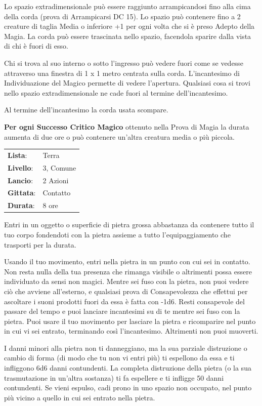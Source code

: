 \begin{multicols}{2}
Lo spazio extradimensionale può essere raggiunto arrampicandosi fino alla cima della corda (prova di Arrampicarsi DC 15). Lo spazio può contenere fino a 2 creature di taglia Media o inferiore +1 per ogni volta che si è preso Adepto della Magia. La corda può essere trascinata nello spazio, facendola sparire dalla vista di chi è fuori di esso.

Chi si trova al suo interno o sotto l'ingresso può vedere fuori come se vedesse attraverso una finestra di 1 x 1 metro centrata sulla corda. L'incantesimo di Individuazione del Magico permette di vedere l'apertura. Qualsiasi cosa si trovi nello spazio extradimensionale ne cade fuori al termine dell'incantesimo.

Al termine dell'incantesimo la corda usata scompare.

\textbf{Per ogni Successo Critico Magico} ottenuto nella Prova di Magia la durata aumenta di due ore o può contenere un'altra creatura media o più piccola.

\noindent\begin{tabularx}{\linewidth}{p{1.3cm}X}
	\rowcolor{gray!20}\textbf{Lista}: & Terra \\
	\textbf{Livello}: & 3, Comune \\
	\rowcolor{gray!20}\textbf{Lancio}: & 2 Azioni \\
	\textbf{Gittata}: & Contatto \\
	\rowcolor{gray!20}\textbf{Durata}: & 8 ore \\
\end{tabularx}\smallskip

Entri in un oggetto o superficie di pietra grossa abbastanza da contenere tutto il tuo corpo fondendoti con la pietra assieme a tutto l'equipaggiamento che trasporti per la durata.

Usando il tuo movimento, entri nella pietra in un punto con cui sei in contatto. Non resta nulla della tua presenza che rimanga visibile o altrimenti possa essere individuato da sensi non magici. Mentre sei fuso con la pietra, non puoi vedere ciò che avviene all'esterno, e qualsiasi prova di Consapevolezza che effettui per ascoltare i suoni prodotti fuori da essa è fatta con -1d6. Resti consapevole del passare del tempo e puoi lanciare incantesimi su di te mentre sei fuso con la pietra. Puoi usare il tuo movimento per lasciare la pietra e ricomparire nel punto in cui vi sei entrato, terminando così l'incantesimo. Altrimenti non puoi muoverti.

I danni minori alla pietra non ti danneggiano, ma la sua parziale distruzione o cambio di forma (di modo che tu non vi entri più) ti espellono da essa e ti infliggono 6d6 danni contundenti. La completa distruzione della pietra (o la sua trasmutazione in un'altra sostanza) ti fa espellere e ti infligge 50 danni contundenti. Se vieni espulso, cadi prono in uno spazio non occupato, nel punto più vicino a quello in cui sei entrato nella pietra.


\end{multicols}
